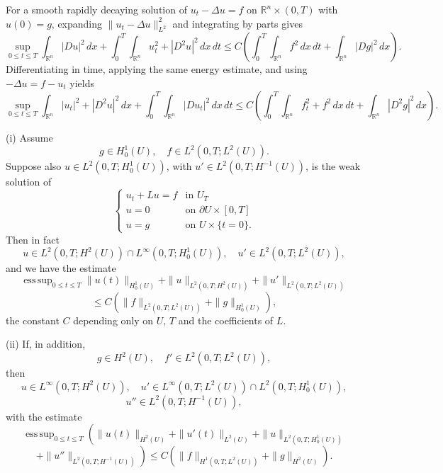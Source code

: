 \begin{remark}
\label{rem:parabolic-regularity-motivation}
For a smooth rapidly decaying solution of $u_t-\Delta u=f$ on $\mathbb R^n\times(0,T)$ with $u(0)=g$, expanding $\|u_t-\Delta u\|_{L^2}^2$ and integrating by parts gives
\[
\sup_{0\le t\le T}\int_{\mathbb R^n}|Du|^2\,dx
+\int_0^T\int_{\mathbb R^n}u_t^2+|D^2u|^2\,dx\,dt
\le C\left(\int_0^T\int_{\mathbb R^n}f^2\,dx\,dt+\int_{\mathbb R^n}|Dg|^2\,dx\right).
\tag{39}
\]
Differentiating in time, applying the same energy estimate, and using $-\Delta u=f-u_t$ yields
\[
\sup_{0\le t\le T}\int_{\mathbb R^n}|u_t|^2+|D^2u|^2\,dx
+\int_0^T\int_{\mathbb R^n}|Du_t|^2\,dx\,dt
\le C\left(\int_0^T\int_{\mathbb R^n}f_t^2+f^2\,dx\,dt+\int_{\mathbb R^n}|D^2g|^2\,dx\right).
\tag{44}
\]
\end{remark}

\begin{theorem}
\label{thm:parabolic-improved-regularity}
(i) Assume
\[
g \in H_0^1(U), \quad f \in L^2(0,T; L^2(U)).
\]
Suppose also $u \in L^2(0,T; H_0^1(U))$, with $u' \in L^2(0,T; H^{-1}(U))$, is the weak solution of
\[
\begin{cases}
u_t + Lu = f & \text{in } U_T \\
u = 0 & \text{on } \partial U \times [0,T] \\
u = g & \text{on } U \times \{t = 0\}.
\end{cases}
\]
Then in fact
\[
u \in L^2(0,T; H^2(U)) \cap L^\infty(0,T; H_0^1(U)), \quad u' \in L^2(0,T; L^2(U)),
\]
and we have the estimate
\[
\operatorname{ess\,sup}_{0 \leq t \leq T} \|u(t)\|_{H_0^1(U)} + \|u\|_{L^2(0,T; H^2(U))} + \|u'\|_{L^2(0,T; L^2(U))}
\]
\[
\leq C \left( \|f\|_{L^2(0,T; L^2(U))} + \|g\|_{H_0^1(U)} \right),
\tag{46}
\]
the constant $C$ depending only on $U$, $T$ and the coefficients of $L$.

(ii) If, in addition,
\[
g \in H^2(U), \quad f' \in L^2(0,T;L^2(U)),
\]
then
\[
u \in L^\infty(0,T;H^2(U)), \quad u' \in L^\infty(0,T;L^2(U)) \cap L^2(0,T;H_0^1(U)),
\]
\[
u'' \in L^2(0,T;H^{-1}(U)),
\]
with the estimate
\[
\operatorname{ess\,sup}_{0 \leq t \leq T} \left( \|u(t)\|_{H^2(U)} + \|u'(t)\|_{L^2(U)} + \|u\|_{L^2(0,T;H_0^1(U))} \right.
\]
\[
\left. + \|u''\|_{L^2(0,T;H^{-1}(U))} \right) \leq C \left( \|f\|_{H^1(0,T;L^2(U))} + \|g\|_{H^2(U)} \right).
\tag{47}
\]
\end{theorem}

